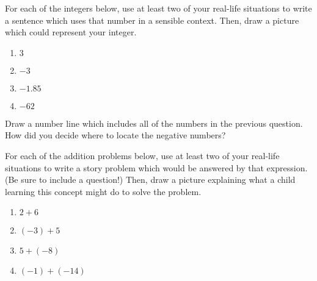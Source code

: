 \documentclass{ximera}
\begin{document}
\begin{question}
For each of the integers below, use at least two of your real-life situations to write a sentence which uses that number in a sensible context.  Then, draw a picture which could represent your integer.
\begin{enumerate}
    \item $3$
    \item $-3$
    \item $-1.85$
    \item $-62$
\end{enumerate}

\end{question}

\begin{question}
Draw a number line which includes all of the numbers in the previous question.  How did you decide where to locate the negative numbers?
\end{question}

\begin{question}
For each of the addition problems below, use at least two of your real-life situations to write a story problem which would be answered by that expression.  (Be sure to include a question!)  Then, draw a picture explaining what a child learning this concept might do to solve the problem.
\begin{enumerate}
    \item $2+6$
    \item $(-3) + 5$
    \item $5 + (-8)$
    \item $(-1) + (-14)$
\end{enumerate}

\end{question}
\end{document}
